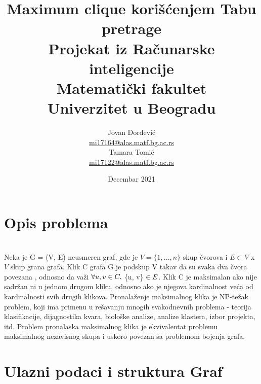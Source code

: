 \documentclass[12pt]{article}
\title{Maximum clique korišćenjem Tabu pretrage \vspace{0.4cm}\\
\large Projekat iz Računarske inteligencije \\ Matematički fakultet \\ Univerzitet u Beogradu  \vspace{1cm} \\}
\author{Jovan Đorđević\\
\href{mailto:mi17164@alas.matf.bg.ac.rs}{mi17164@alas.matf.bg.ac.rs} \\
Tamara Tomić\\
\href{mailto:mi17122@alas.matf.bg.ac.rs}{mi17122@alas.matf.bg.ac.rs} \vspace{0.5cm} \\
}
\date{Decembar 2021}
\begin{document}
\maketitle

\newpage

\renewcommand*\contentsname{Sadržaj}
\tableofcontents

\newpage

\section{Opis problema} \\
Neka je G = (V, E) neusmeren graf, gde je $V = \{1,...,n\}$ skup čvorova i $ E \subset V $ x $ V $ skup grana grafa. Klik C grafa G je podskup V takav da su svaka dva čvora povezana , odnosno da važi $\forall u, v \in C, \hspace{0.1cm} $\{u, v\}$ \hspace{0.1cm} \in E $. Klik C je maksimalan ako nije sadržan ni u jednom drugom kliku, odnosno ako je njegova kardinalnost veća od kardinalnosti svih drugih klikova. Pronalaženje maksimalnog klika je NP-težak problem, koji ima primenu u rešavanju mnogih svakodnevnih problema - teorija klasifikacije, dijagnostika kvara, biološke analize, analize klastera, izbor projekta, itd. Problem pronalaska maksimalnog klika je ekvivalentat problemu maksimalnog nezavisnog skupa i uskoro povezan sa problemom bojenja grafa.

\section{Ulazni podaci i struktura Graf}
\end{document}
